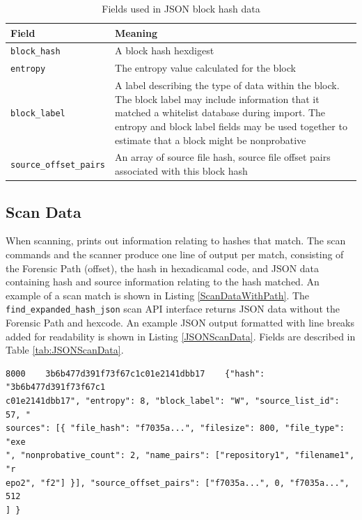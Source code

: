 \documentclass[11pt,fleqn]{article} %
\begin{document}
\begin{table}[!ht]

\centering
\caption{Fields used in JSON block hash data}
\label{tab:JSONBlockHashData}
\begin{tabular}{|p{5 cm}|p{8.8 cm}|}
\hline \hline
\textbf{Field} & \textbf{Meaning} \\
\hline
\verb+block_hash+ & A block hash hexdigest\\
\hline
\verb+entropy+ & The entropy value calculated for the block\\
\hline
\verb+block_label+ & A label describing the type of data within the block. The block label may include information that it matched a whitelist database during import. The entropy and block label fields may be used together to estimate that a block might be nonprobative\\
\hline
\verb+source_offset_pairs+ & An array of source file hash, source file offset pairs associated with this block hash\\
\hline
\end{tabular}
\end{table}

\subsection{Scan Data}
\label{ScanData}
When scanning, \hdb prints out information relating to hashes that match.
The \hdb scan commands and the \bulk \hdb scanner produce one line of output per match, consisting of the Forensic Path (offset), the hash in hexadicamal code, and JSON data containing hash and source information relating to the hash matched. An example of a scan match is shown in Listing \ref{ScanDataWithPath}.  The \verb+find_expanded_hash_json+ scan API interface returns JSON data without the Forensic Path and hexcode. An example JSON output formatted with line breaks added for readability is shown in Listing \ref{JSONScanData}. Fields are described in Table \ref{tab:JSONScanData}.\\

\lstset{style=customfile}
\begin{lstlisting}[float, caption={Example output from a scan match}, label=ScanDataWithPath]
8000	3b6b477d391f73f67c1c01e2141dbb17    {"hash": "3b6b477d391f73f67c1
c01e2141dbb17", "entropy": 8, "block_label": "W", "source_list_id": 57, "
sources": [{ "file_hash": "f7035a...", "filesize": 800, "file_type": "exe
", "nonprobative_count": 2, "name_pairs": ["repository1", "filename1", "r
epo2", "f2"] }], "source_offset_pairs": ["f7035a...", 0, "f7035a...", 512
] }
\end{lstlisting}
\end{document}
